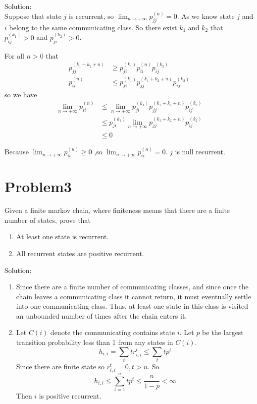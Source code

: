 \documentclass[12pt]{article}
\begin{document}
Solution:\\

Suppose that state $j$ is recurrent, so $\lim_{n \to +\infty}p_{jj}^{(n)} = 0 $. As we know state $j$ and $i$ belong to the same communicating class. So there exist $k_1$ and $k_2$ that $p_{ij}^{(k_1)} >0$ and $p_{ji}^{(k_2)} >0$.

For all $n>0$ that
\begin{equation}
    \begin{split}
    p_{jj}^{(k_1+k_2+n)} &\ge p_{ji}^{(k_1)} p_{ii}^{(n)} p_{ij}^{(k_2)}\\
    p_{ii}^{(n)} &\le p_{ji}^{(k_1)} p_{jj}^{(k_1+k_2+n)} p_{ij}^{(k_2)}
    \end{split}
\end{equation}
so we have
\begin{equation}
    \begin{split}
    \lim_{n \to +\infty}p_{ii}^{(n)} &\le \lim_{n \to +\infty} p_{ji}^{(k_1)} p_{jj}^{(k_1+k_2+n)} p_{ij}^{(k_2)} \\
    &\le p_{ji}^{(k_1)} \lim_{n \to +\infty}p_{jj}^{(k_1+k_2+n)} p_{ij}^{(k_2)} \\
    &\le 0
    \end{split}
\end{equation}

Because $\lim_{n \to +\infty}p_{ii}^{(n)} \ge 0$ ,so $\lim_{n \to +\infty}p_{ii}^{(n)} = 0$. $j$  is null recurrent.

\section{Problem3}
Given a finite markov chain, where finiteness means that there are a finite number of states, prove that
\begin{enumerate}
\item At least one state is recurrent.
\item All recurrent states are positive recurrent.
\end{enumerate}

Solution:\\
\begin{enumerate}
    \item
     Since there are a finite number of communicating classes, and
since once the chain leaves a communicating class it cannot return, it must
eventually settle into one communicating class. Thus, at least one state in this
class is visited an unbounded number of times after the chain enters it.
    \item
    Let $C(i)$ denote the communicating contains state $i$. Let $p$ be the largest transition probability less than 1 from any states in $C(i)$.
    \begin{equation}
        h_{i,i} = \sum_t t r_{i,i}^t \le \sum_t t p^t
    \end{equation}
    Since there are finite state so $r_{i,i}^t = 0, t>n$. So 
    \begin{equation}
        h_{i,i} \le \sum_{t=1}^{n} t p^t \le \frac{n}{1-p} < \infty
    \end{equation}
    Then $i$ is positive recurrent.

\end{enumerate}
\end{document}
